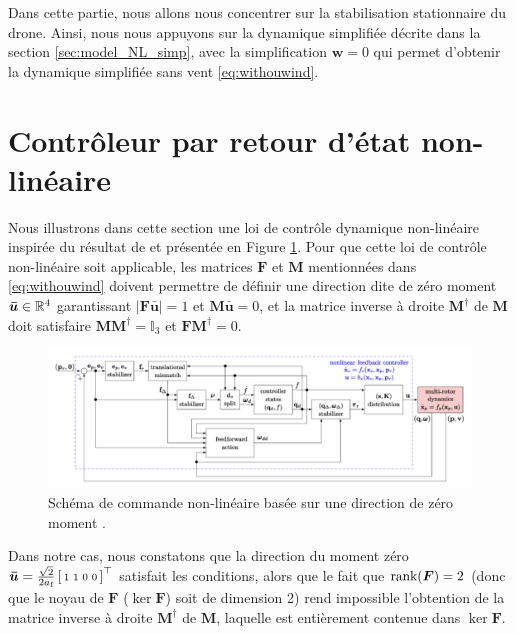 Dans cette partie, nous allons nous concentrer sur la stabilisation stationnaire du drone. Ainsi, nous nous appuyons sur la dynamique simplifiée décrite dans la section \ref{sec:model_NL_simp}, avec la simplification $\boldsymbol{w} = 0$ qui permet d'obtenir la dynamique simplifiée sans vent \eqref{eq:withouwind}. 



\section{Contrôleur par retour d'état non-linéaire}
Nous illustrons dans cette section une loi de contrôle dynamique non-linéaire inspirée du résultat de \cite{2020e-MicCenZacFra} et présentée en Figure \ref{fig:NLZeroMoment}. Pour que cette loi de contrôle non-linéaire soit applicable, les matrices $\boldsymbol{F}$ et $\boldsymbol{M}$ mentionnées dans \eqref{eq:withouwind} doivent permettre de définir une direction dite de zéro moment $\boldsymbol{\bar u} \in {\mathbb R}^4$ garantissant
$|\boldsymbol{F}\boldsymbol{\bar u}| = 1$ et $\boldsymbol{M} \boldsymbol{\bar u}=0$, et la matrice inverse à droite $\boldsymbol{M}^{\dag}$ de $\boldsymbol{M}$ doit satisfaire $\boldsymbol{M} \boldsymbol{M}^{\dag} = \mathbb{I}_3$ et $\boldsymbol{F}\boldsymbol{M}^{\dag}=0$. 

\begin{figure}[ht!]
  \centering
  \includegraphics[trim=0cm 0.6cm 0cm 0.6cm,clip,width=1\columnwidth]{figures/NLZeroMoment.png}
  \caption{Schéma de commande non-linéaire basée sur une direction de zéro moment \cite{2020e-MicCenZacFra}.}
  \label{fig:NLZeroMoment}
\end{figure}

Dans notre cas, nous constatons que la direction du moment zéro $\boldsymbol{\bar u} = \frac{\sqrt{2}}{2a_{\text{f}}}\left[ \begin{smallmatrix}1&1&0&0 \end{smallmatrix} \right]^\top$ satisfait les conditions, alors que le fait que $\operatorname{rank}(\boldsymbol{F}) = 2$ (donc que le noyau de $\boldsymbol{F}$ ($\ker \boldsymbol{F}$) soit de dimension 2) rend impossible l'obtention de la matrice inverse à droite $\boldsymbol{M}^{\dag}$ de $\boldsymbol{M}$, laquelle est entièrement contenue dans $\ker \boldsymbol{F}$.

